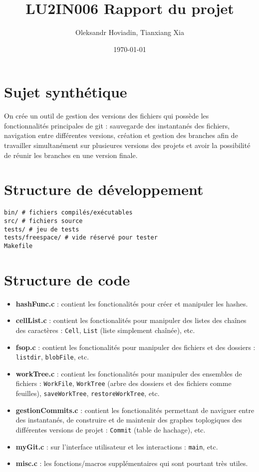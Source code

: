 \documentclass{report}
\title{LU2IN006 Rapport du projet}
\author{Oleksandr Hoviadin, Tianxiang Xia}
\date{\today}
\begin{document}
\maketitle
\section*{Sujet synthétique}
On crée un outil de gestion des versions des fichiers
qui possède les fonctionnalités principales de git : sauvegarde des instantanés
des fichiers, navigation entre différentes versions,
création et gestion des branches afin de travailler simultanément
sur plusieures versions des projets et avoir la possibilité de réunir les branches en une version finale.

\section*{Structure de développement}

\begin{verbatim}
bin/ # fichiers compilés/exécutables
src/ # fichiers source
tests/ # jeu de tests
tests/freespace/ # vide réservé pour tester
Makefile
\end{verbatim}

\section*{Structure de code}
\begin{itemize}
    \item \textbf{hashFunc.c} : contient les fonctionalités pour créer et manipuler les hashes.
    \item \textbf{cellList.c} : contient les fonctionalités pour manipuler des listes des chaînes des caractères : \verb|Cell|, \verb|List| (liste simplement chaînée), etc.
    \item \textbf{fsop.c} : contient les fonctionalités pour manipuler des fichiers et des dossiers : \verb|listdir|, \verb|blobFile|, etc.
    \item \textbf{workTree.c} : contient les fonctionalités pour manipuler des ensembles de fichiers : \verb|WorkFile|,
    \verb|WorkTree| (arbre des dossiers et des fichiers comme feuilles),
    \verb|saveWorkTree|, \verb|restoreWorkTree|, etc.
    \item \textbf{gestionCommits.c} : contient les fonctionalités permettant de naviguer entre des instantanés, de construire
    et de maintenir des graphes toplogiques des différentes versions de projet :
    \verb|Commit| (table de hachage), etc.
    \item\textbf{myGit.c} : sur l'interface utilisateur et les interactions : \verb|main|, etc.
    \item\textbf{misc.c} : les fonctions/macros supplémentaires qui sont pourtant très utiles.
\end{itemize}
\end{document}
